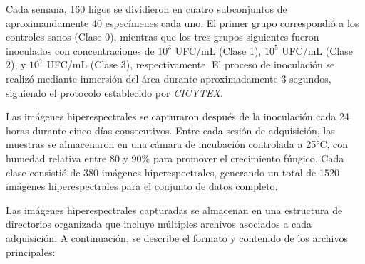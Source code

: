\vspace{5mm}

Cada semana, 160 higos se dividieron en cuatro subconjuntos de aproximandamente 40 especímenes cada uno. El primer grupo correspondió a los controles sanos (Clase 0), mientras que los tres grupos siguientes fueron inoculados con concentraciones de $10^3$ UFC/mL (Clase 1), $10^5$ UFC/mL (Clase 2), y $10^7$ UFC/mL (Clase 3), respectivamente. El proceso de inoculación se realizó mediante inmersión del área durante aproximadamente 3 segundos, siguiendo el protocolo establecido por \emph{CICYTEX}.

\vspace{5mm}

Las imágenes hiperespectrales se capturaron después de la inoculación cada 24 horas durante cinco días consecutivos. Entre cada sesión de adquisición, las muestras se almacenaron en una cámara de incubación controlada a 25°C, con humedad relativa entre 80 y 90\% para promover el crecimiento fúngico. Cada clase consistió de 380 imágenes hiperespectrales, generando un total de 1520 imágenes hiperespectrales para el conjunto de datos completo.

\vspace{5mm}

Las imágenes hiperespectrales capturadas se almacenan en una estructura de directorios organizada que incluye múltiples archivos asociados a cada adquisición. A continuación, se describe el formato y contenido de los archivos principales:

